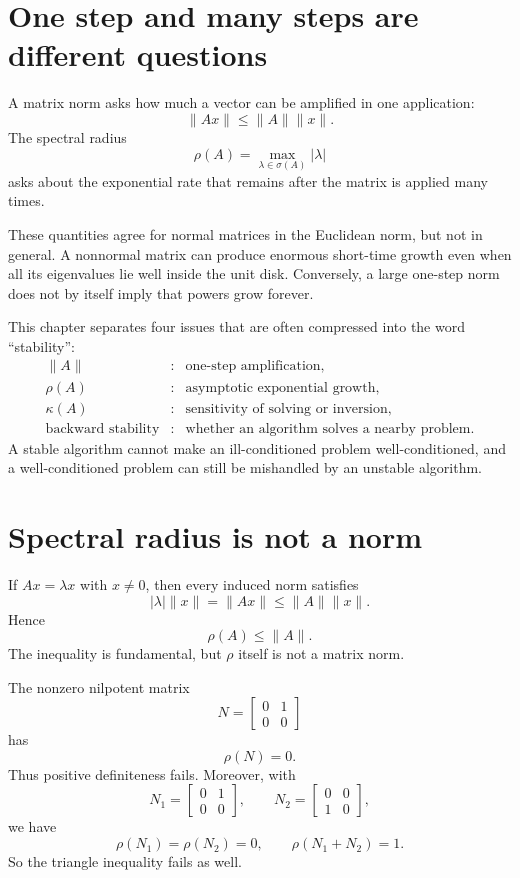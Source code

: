 
\section{One step and many steps are different questions}

A matrix norm asks how much a vector can be amplified in one application:
\[
  \|Ax\|\le\|A\|\|x\|.
\]
The spectral radius
\[
  \rho(A)=\max_{\lambda\in\sigma(A)}|\lambda|
\]
asks about the exponential rate that remains after the matrix is applied many times.

These quantities agree for normal matrices in the Euclidean norm, but not in general.  A nonnormal matrix can produce enormous short-time growth even when all its eigenvalues lie well inside the unit disk.  Conversely, a large one-step norm does not by itself imply that powers grow forever.

This chapter separates four issues that are often compressed into the word ``stability'':
\[
\begin{array}{ccl}
\|A\| &:& \text{one-step amplification},\\
\rho(A) &:& \text{asymptotic exponential growth},\\
\kappa(A) &:& \text{sensitivity of solving or inversion},\\
\text{backward stability} &:& \text{whether an algorithm solves a nearby problem}.
\end{array}
\]
A stable algorithm cannot make an ill-conditioned problem well-conditioned, and a well-conditioned problem can still be mishandled by an unstable algorithm.

\section{Spectral radius is not a norm}

If \(Ax=\lambda x\) with \(x\ne0\), then every induced norm satisfies
\[
  |\lambda|\|x\|=\|Ax\|\le\|A\|\|x\|.
\]
Hence
\[
  \rho(A)\le\|A\|.
\]
The inequality is fundamental, but \(\rho\) itself is not a matrix norm.

The nonzero nilpotent matrix
\[
  N=
  \begin{bmatrix}
    0&1\\
    0&0
  \end{bmatrix}
\]
has
\[
  \rho(N)=0.
\]
Thus positive definiteness fails.  Moreover, with
\[
  N_1=
  \begin{bmatrix}0&1\\0&0\end{bmatrix},
  \qquad
  N_2=
  \begin{bmatrix}0&0\\1&0\end{bmatrix},
\]
we have
\[
  \rho(N_1)=\rho(N_2)=0,
  \qquad
  \rho(N_1+N_2)=1.
\]
So the triangle inequality fails as well.

